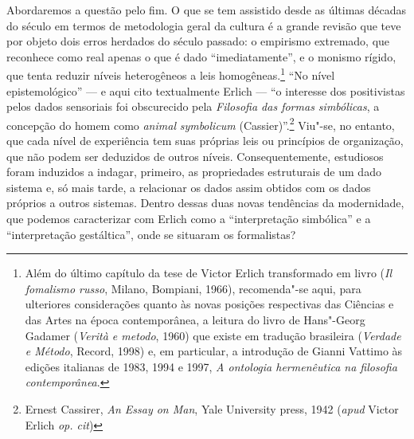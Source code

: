 Abordaremos a questão pelo fim. O que se tem assistido desde as últimas
décadas do século  em termos de metodologia geral da cultura é a
grande revisão que teve por objeto dois erros herdados do século
passado: o empirismo extremado, que reconhece como real apenas o que é
dado ``imediatamente'', e o monismo rígido, que tenta reduzir níveis
heterogêneos a leis homogêneas.\footnote{Além do último capítulo da
  tese de Victor Erlich transformado em livro (\emph{Il fomalismo
  russo}, Milano, Bompiani, 1966), recomenda"-se aqui, para ulteriores
  considerações quanto às novas posições respectivas das Ciências e das
  Artes na época contemporânea, a leitura do livro de Hans"-Georg Gadamer
  (\emph{Verità e metodo}, 1960) que existe em tradução brasileira
  (\emph{Verdade e Método}, Record, 1998) e, em particular, a introdução
  de Gianni Vattimo às edições italianas de 1983, 1994 e 1997, \emph{A
  ontologia hermenêutica na filosofia contemporânea}.} ``No nível
epistemológico'' --- e aqui cito textualmente Erlich --- ``o interesse dos
positivistas pelos dados sensoriais foi obscurecido pela \emph{Filosofia
das formas simbólicas}, a concepção do homem como \emph{animal}
\emph{symbolicum} (Cassier)''.\footnote{Ernest Cassirer, \emph{An Essay
  on Man}, Yale University press, 1942 (\emph{apud} Victor Erlich \emph{op. cit})}
Viu"-se, no entanto, que cada nível de experiência tem suas próprias leis ou
princípios de organização, que não podem ser deduzidos de outros níveis.
Consequentemente, estudiosos foram induzidos a indagar, primeiro, as
propriedades estruturais de um dado sistema e, só mais tarde, a
relacionar os dados assim obtidos com os dados próprios a outros
sistemas. Dentro dessas duas novas tendências da modernidade, que
podemos caracterizar com Erlich como a ``interpretação simbólica'' e a
``interpretação gestáltica'', onde se situaram os formalistas?

